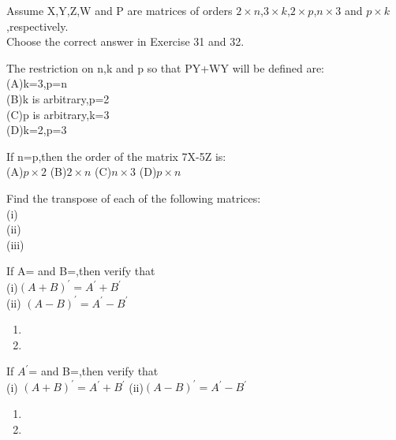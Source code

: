 Assume X,Y,Z,W and P are matrices of orders $2\times n$,$3 \times k$,$2\times p$,$n\times 3$ and $p\times k$,respectively.\\
Choose the correct answer in Exercise 31 and 32.\\
\item The restriction on n,k and p so that PY+WY will be defined are:\\
(A)k=3,p=n\\
 (B)k is arbitrary,p=2 \\
 (C)p is arbitrary,k=3 \\
 (D)k=2,p=3\\
\item If n=p,then the order of the matrix 7X-5Z is:\\
(A)$p \times 2$ (B)$2 \times n$ (C)$n \times 3$ (D)$p \times n$\\
\item Find the transpose of each of the following matrices:\\
(i)\\ (ii)\\ (iii)\\
\item If A= and B=,then verify that\\
(i)$(A+B)^{'}=A^{'}+B^{'}$ \\(ii) $(A-B)^{'}=A^{'}-B^{'}$\\
\solution
\begin{enumerate}
  \item 
  \item 
\end{enumerate}
\item If $A^{'}$= and B=,then verify that\\
(i) $(A+B)^{'}=A^{'}+B^{'}$ (ii)$(A-B)^{'}=A^{'}-B^{'}$
\\
\solution
\begin{enumerate}
  \item 
  \item 
\end{enumerate}

